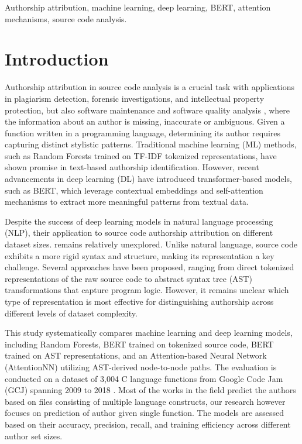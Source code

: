 \documentclass[conference]{IEEEtran}
\begin{document}
\begin{IEEEkeywords}
Authorship attribution, machine learning, deep learning, BERT, attention mechanisms, source code analysis.
\end{IEEEkeywords}

\section{Introduction}

Authorship attribution in source code analysis is a crucial task 
with applications in plagiarism detection, forensic investigations, and 
intellectual property protection, but also software maintenance 
and software quality analysis \cite{pbnn}, where the information about an author 
is missing, inaccurate or ambiguous.
Given a function written in a programming
language, determining its author requires capturing distinct stylistic 
patterns. Traditional machine learning (ML) methods, such as Random 
Forests trained on TF-IDF tokenized representations, have shown promise 
in text-based authorship identification. However, recent advancements 
in deep learning (DL) have introduced transformer-based models, such as 
BERT, which leverage contextual embeddings and self-attention mechanisms 
to extract more meaningful patterns from textual data.

Despite the success of deep learning models in natural language 
processing (NLP), their application to source code authorship attribution on different dataset sizes. 
remains relatively unexplored. Unlike natural language, source code 
exhibits a more rigid syntax and structure, making its representation 
a key challenge. Several approaches have been proposed, ranging from 
direct tokenized representations of the raw source code to abstract 
syntax tree (AST) transformations that capture program logic. However, 
it remains unclear which type of representation is most effective for 
distinguishing authorship across different levels of dataset complexity.

This study systematically compares machine learning and deep learning 
models, including Random Forests, BERT trained on tokenized source code, 
BERT trained on AST representations, and an Attention-based Neural Network 
(AttentionNN) utilizing AST-derived node-to-node paths. The evaluation is 
conducted on a dataset of 3,004 C language functions from Google Code Jam 
(GCJ) spanning 2009 to 2018 \cite{gcj}. Most of the works in the field
predict the authors based on files consisting of multiple language constructs, our 
research however focuses on prediction of author given single function.
The models are assessed based on their accuracy, precision, recall, and training efficiency across different 
author set sizes.
\end{document}
